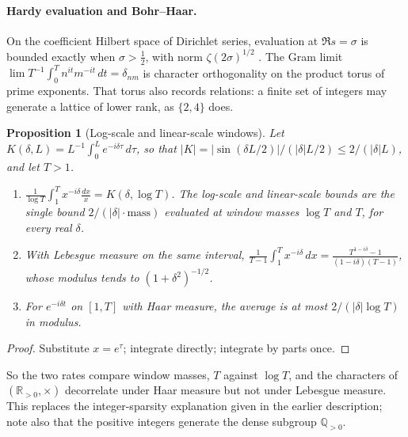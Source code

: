 \documentclass[11pt]{article}
\newtheorem{proposition}[theorem]{Proposition}
\theoremstyle{definition}\newtheorem{definition}[theorem]{Definition}
\theoremstyle{remark}\newtheorem{remark}[theorem]{Remark}
\newcommand{\R}{\mathbb R}\newcommand{\C}{\mathbb C}\newcommand{\Z}{\mathbb Z}
\newcommand{\Q}{\mathbb Q}\newcommand{\T}{\mathbb T}
\newcommand{\dd}{\,d}\newcommand{\norm}[1]{\left\lVert#1\right\rVert}
\begin{document}
\paragraph{Hardy evaluation and Bohr--Haar.} On the coefficient Hilbert space
of Dirichlet series, evaluation at $\Re s=\sigma$ is bounded exactly when
$\sigma>\frac12$, with norm $\zeta(2\sigma)^{1/2}$ \cite{hardy}. The Gram limit
$\lim T^{-1}\int_0^Tn^{it}m^{-it}\dd t=\delta_{nm}$ is character orthogonality on
the product torus of prime exponents. That torus also records relations: a
finite set of integers may generate a lattice of lower rank, as $\{2,4\}$ does.

\begin{proposition}[Log-scale and linear-scale windows]\label{prop:windows}
Let $K(\delta,L)=L^{-1}\int_0^Le^{-i\delta\tau}\dd\tau$, so that
$|K|=|\sin(\delta L/2)|/(|\delta|L/2)\leq2/(|\delta|L)$, and let $T>1$.
\begin{enumerate}
\item $\frac1{\log T}\int_1^Tx^{-i\delta}\frac{dx}x=K(\delta,\log T)$. The
log-scale and linear-scale bounds are the single bound $2/(|\delta|\cdot\text{mass})$
evaluated at window masses $\log T$ and $T$, for every real $\delta$.
\item With Lebesgue measure on the same interval,
$\frac1{T-1}\int_1^Tx^{-i\delta}\dd x=\frac{T^{1-i\delta}-1}{(1-i\delta)(T-1)}$,
whose modulus tends to $(1+\delta^2)^{-1/2}$.
\item For $e^{-i\delta t}$ on $[1,T]$ with Haar measure, the average is at most
$2/(|\delta|\log T)$ in modulus.
\end{enumerate}
\end{proposition}
\begin{proof}
Substitute $x=e^\tau$; integrate directly; integrate by parts once.
\end{proof}
So the two rates compare window masses, $T$ against $\log T$, and the
characters of $(\R_{>0},\times)$ decorrelate under Haar measure but not under
Lebesgue measure. This replaces the integer-sparsity explanation given in the
earlier description; note also that the positive integers generate the dense
subgroup $\Q_{>0}$.
\end{document}
